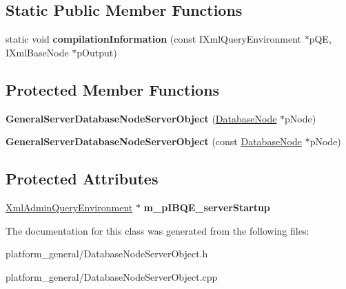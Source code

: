 \subsection*{\-Static \-Public \-Member \-Functions}
\begin{DoxyCompactItemize}
\item 
\hypertarget{classgeneral__server_1_1GeneralServerDatabaseNodeServerObject_a3e20bc30f59eadfb67d76a3e758c8b8e}{static void {\bfseries compilation\-Information} (const \-I\-Xml\-Query\-Environment $\ast$p\-Q\-E, \-I\-Xml\-Base\-Node $\ast$p\-Output)}\label{classgeneral__server_1_1GeneralServerDatabaseNodeServerObject_a3e20bc30f59eadfb67d76a3e758c8b8e}

\end{DoxyCompactItemize}
\subsection*{\-Protected \-Member \-Functions}
\begin{DoxyCompactItemize}
\item 
\hypertarget{classgeneral__server_1_1GeneralServerDatabaseNodeServerObject_a9ed0747ffb0b25db0721201018d5919f}{{\bfseries \-General\-Server\-Database\-Node\-Server\-Object} (\hyperlink{classgeneral__server_1_1DatabaseNode}{\-Database\-Node} $\ast$p\-Node)}\label{classgeneral__server_1_1GeneralServerDatabaseNodeServerObject_a9ed0747ffb0b25db0721201018d5919f}

\item 
\hypertarget{classgeneral__server_1_1GeneralServerDatabaseNodeServerObject_aa01493e54bf2084f5cc9708869846018}{{\bfseries \-General\-Server\-Database\-Node\-Server\-Object} (const \hyperlink{classgeneral__server_1_1DatabaseNode}{\-Database\-Node} $\ast$p\-Node)}\label{classgeneral__server_1_1GeneralServerDatabaseNodeServerObject_aa01493e54bf2084f5cc9708869846018}

\end{DoxyCompactItemize}
\subsection*{\-Protected \-Attributes}
\begin{DoxyCompactItemize}
\item 
\hypertarget{classgeneral__server_1_1GeneralServerDatabaseNodeServerObject_a395d52133cfb28af82820ff4d174f62d}{\hyperlink{classgeneral__server_1_1XmlAdminQueryEnvironment}{\-Xml\-Admin\-Query\-Environment} $\ast$ {\bfseries m\-\_\-p\-I\-B\-Q\-E\-\_\-server\-Startup}}\label{classgeneral__server_1_1GeneralServerDatabaseNodeServerObject_a395d52133cfb28af82820ff4d174f62d}

\end{DoxyCompactItemize}


\-The documentation for this class was generated from the following files\-:\begin{DoxyCompactItemize}
\item 
platform\-\_\-general/\-Database\-Node\-Server\-Object.\-h\item 
platform\-\_\-general/\-Database\-Node\-Server\-Object.\-cpp\end{DoxyCompactItemize}
